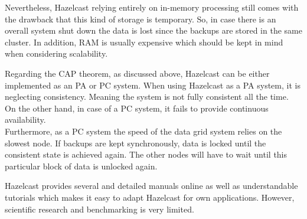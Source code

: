 Nevertheless, Hazelcast relying entirely on in-memory processing still comes with the drawback that this kind of storage is temporary. So, in case there is an overall system shut down the data is lost since the backups are stored in the same cluster. In addition, RAM is usually expensive which should be kept in mind when considering scalability.

Regarding the CAP theorem, as discussed above, Hazelcast can be either implemented as an PA or PC system. When using Hazelcast as a PA system, it is neglecting consistency. Meaning the system is not fully consistent all the time. On the other hand, in case of a PC system, it fails to provide continuous availability.\\
Furthermore, as a PC system the speed of the data grid system relies on the slowest node. If backups are kept synchronously, data is locked until the consistent state is achieved again. \cite{johns2015} The other nodes will have to wait until this particular block of data is unlocked again.

Hazelcast provides several and detailed manuals online as well as understandable tutorials which makes it easy to adapt Hazelcast for own applications. However, scientific research and benchmarking is very limited.